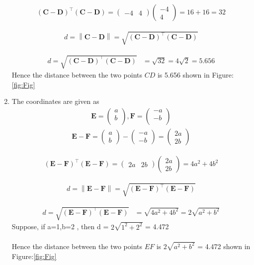 \documentclass[12pt]{article}
\providecommand{\brak}[1]{\ensuremath{\left(#1\right)}}
\providecommand{\norm}[1]{\left\lVert#1\right\rVert}
\newcommand{\myvec}[1]{\ensuremath{\begin{pmatrix}#1\end{pmatrix}}}
\let\vec\mathbf
\begin{document}
\begin{enumerate}
	
	
	\begin{align}
		(\vec{C}-\vec{D})^\top (\vec{C}-\vec{D}) = \myvec{-4&4} \myvec{-4\\4} = 16+16 = 32
	\end{align}
	
	\begin{align}
		d=\norm{\vec{C}-\vec{D}}=\sqrt{\brak{\vec{C} -\vec{D}}^{\top}\brak{\vec{C} -\vec{D}}}
	\end{align}

\begin{align}
d=\sqrt{\brak{\vec{C} -\vec{D}}^{\top}\brak{\vec{C} -\vec{D}}}
 &=\sqrt{32}=4\sqrt{2}=5.656
\end{align}	
	Hence the distance between the two points $CD$ is 5.656 shown in Figure:\ref{fig:Fig}
	

	
\item The coordinates are given as
	\begin{align}
	\vec{E} = \myvec{
		a\\
		b\\
		},
	\vec{F} = \myvec{
		-a\\
		-b\\
		}
	\end{align}
	\begin{align}
		\vec{E} - \vec{F} = \myvec{a\\b} - \myvec{-a\\-b} = \myvec{2a\\2b}		
	\end{align}
	
	
	
	\begin{align}
		(\vec{E}-\vec{F})^\top (\vec{E}-\vec{F}) = \myvec{2a&2b} \myvec{2a\\2b} = 4a^2+4b^2 
	\end{align}
	
	\begin{align}
		d=\norm{\vec{E}-\vec{F}}=\sqrt{\brak{\vec{E} -\vec{F}}^{\top}\brak{\vec{E} -\vec{F}}}
	\end{align}

\begin{align}
d=\sqrt{\brak{\vec{E} -\vec{F}}^{\top}\brak{\vec{E} -\vec{F}}}
 &=\sqrt{4a^2+4b^2 }=2\sqrt{a^2+b^2}
\end{align}	
 Suppose, if a=1,b=2 , then d = $2\sqrt{1^2+2^2}$ = 4.472\\
	\\Hence the distance between the two points $EF$ is $2\sqrt{a^2+b^2}$ = 4.472 shown in Figure:\ref{fig:Fig}


\end{enumerate}
\end{document}
